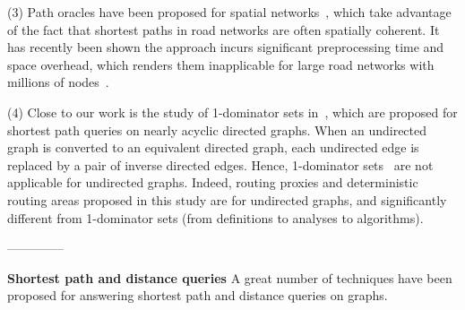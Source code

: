 

\stab(3) Path oracles have been proposed for spatial networks~\cite{SankaranarayananSA09}, which take advantage of the fact that shortest paths in road
networks are often spatially coherent. It has recently been shown the approach incurs significant preprocessing time and space overhead, which renders them inapplicable for large road networks with millions of nodes~\cite{WuXDCZZ12}.



\stab(4) Close to our work is the study of 1-dominator sets in~\cite{SaundersT07}, which are proposed for shortest path queries on nearly acyclic directed graphs. When an undirected graph is converted to an equivalent directed graph, each undirected edge is replaced by a pair of inverse directed edges. Hence,
 1-dominator sets~\cite{SaundersT07} are not applicable for undirected graphs. Indeed, routing proxies and deterministic routing areas proposed in this study  are for undirected graphs,  and  significantly different from 1-dominator sets  (from definitions to analyses to algorithms).



--------------


\smallskip\noindent\textbf{Shortest path and distance queries} A great number of techniques have been proposed for answering shortest path and distance queries on graphs\cite{WuXDCZZ12, Dijkstra59, FredmanT84, LubyR89, GeisbergerSSD08, SankaranarayananSA09, SandersS05, GoldbergH05, ChengKCC12, MozesS12, ChanL07, SaundersT07, WagnerW07, bast2014route, delling2014robust, arz2013transit, PotamiasBCG09, SarmaGNP10, Wei10, ThorupZ05, SankaranarayananS10}.


